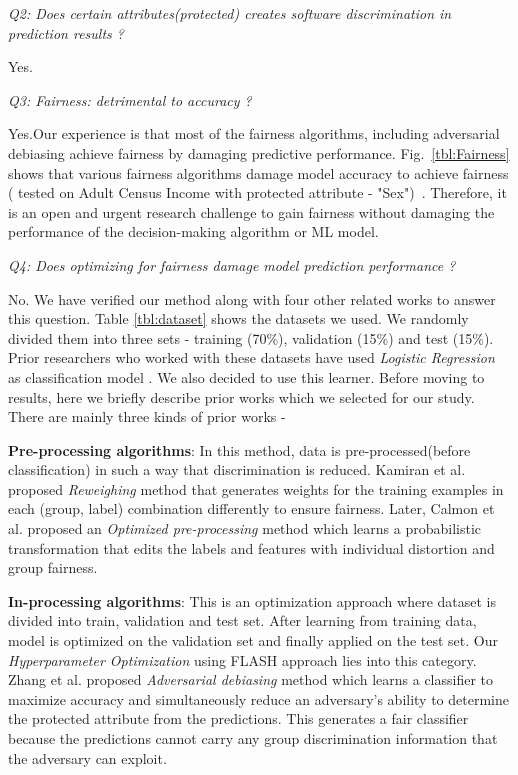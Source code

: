 {\em Q2: Does certain attributes(protected) creates software  discrimination in prediction results ?}

Yes.

{\em Q3: Fairness: detrimental to accuracy ?}

Yes.Our experience is that most of the fairness algorithms, including
adversarial debiasing   achieve fairness by damaging
predictive performance.  Fig.~\ref{tbl:Fairness} shows that various fairness algorithms damage model accuracy to achieve fairness ( tested on  Adult Census Income with protected attribute - "Sex")~\cite{IBM}.
Therefore, it is an open and urgent research challenge to gain fairness without damaging the performance of the decision-making algorithm or ML model.  



{\em Q4: Does optimizing for fairness damage model prediction performance ?}



No. We have verified our method along with four other related works to answer this question. Table \ref{tbl:dataset} shows the datasets we used. We randomly divided them into three sets - training (70\%), validation (15\%) and test (15\%). Prior researchers who worked with these datasets have used \textit{Logistic Regression} as classification model \cite{Kamishima,NIPS2017_6988,Hardt}. We also decided to use this learner. Before moving to results, here we briefly describe prior works which we selected for our study. There are mainly three kinds of prior works -

\bi
\item \textbf{Pre-processing algorithms}: In this method, data is pre-processed(before classification) in such a way that discrimination is reduced. Kamiran et al. proposed \textit{Reweighing} \cite{Kamiran2012} method that generates weights for the training examples in each (group, label) combination differently to ensure fairness. Later, Calmon et al. proposed an \textit{Optimized pre-processing} method \cite{NIPS2017_6988} which learns a probabilistic transformation that edits the labels and features with individual distortion and group fairness.


\item \textbf{In-processing algorithms}: This is an optimization approach where dataset is divided into train, validation and test set. After learning from training data, model is optimized on the validation set and finally applied on the test set. Our \textit{Hyperparameter Optimization} using FLASH approach lies into this category. Zhang et al. proposed \textit{Adversarial debiasing}  \cite{Zhang:2018:MUB:3278721.3278779} method which learns a classifier to maximize accuracy and simultaneously reduce an adversary's ability to determine the protected attribute from the predictions. This generates a fair classifier because the predictions cannot carry any group discrimination information that the adversary can exploit.



